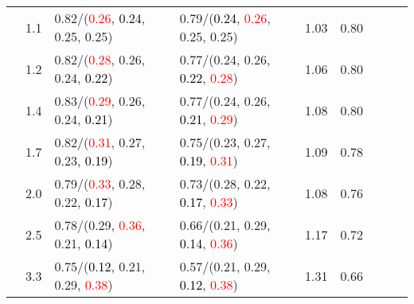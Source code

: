 \documentclass[10pt,a4paper]{report}
\begin{document}
\begin{table}[!htbp]
\begin{center}
{\begin{tabular}{ccllccccc}
				  & 1.1                               & 0.82/(\textcolor{red}{0.26}, \textcolor{black}{0.24}, 0.25, 0.25)                                                                               & 0.79/(\textcolor{black}{0.24}, \textcolor{red}{0.26}, 0.25, 0.25)                                                                               & 1.03             & 0.80                     \\
				  & 1.2                               & 0.82/(\textcolor{red}{0.28}, 0.26, 0.24, \textcolor{black}{0.22})                                                                               & 0.77/(0.24, 0.26, \textcolor{black}{0.22}, \textcolor{red}{0.28})                                                                               & 1.06             & 0.80                     \\
				  & 1.4                               & 0.83/(\textcolor{red}{0.29}, 0.26, 0.24, \textcolor{black}{0.21})                                                                               & 0.77/(0.24, 0.26, \textcolor{black}{0.21}, \textcolor{red}{0.29})                                                                               & 1.08             & 0.80                     \\
				  & 1.7                               & 0.82/(\textcolor{red}{0.31}, 0.27, 0.23, \textcolor{black}{0.19})                                                                               & 0.75/(0.23, 0.27, \textcolor{black}{0.19}, \textcolor{red}{0.31})                                                                               & 1.09             & 0.78                     \\
				  & 2.0                               & 0.79/(\textcolor{red}{0.33}, 0.28, 0.22, \textcolor{black}{0.17})                                                                               & 0.73/(0.28, 0.22, \textcolor{black}{0.17}, \textcolor{red}{0.33})                                                                               & 1.08             & 0.76                     \\
				  & 2.5                               & 0.78/(0.29, \textcolor{red}{0.36}, 0.21, \textcolor{black}{0.14})                                                                               & 0.66/(0.21, 0.29, \textcolor{black}{0.14}, \textcolor{red}{0.36})                                                                               & 1.17             & 0.72                     \\
				  & 3.3                               & 0.75/(\textcolor{black}{0.12}, 0.21, 0.29, \textcolor{red}{0.38})                                                                               & 0.57/(0.21, 0.29, \textcolor{black}{0.12}, \textcolor{red}{0.38})                                                                               & 1.31             & 0.66                     \\

\end{tabular}}
\end{center}
\end{table}
\end{document}
